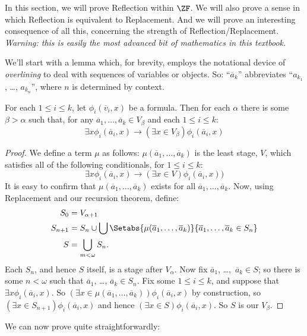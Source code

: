 \documentclass[../../../include/open-logic-section]{subfiles}
\begin{document}
In this section, we will prove Reflection within $\ZF$. We will also prove a sense in which Reflection is equivalent to Replacement. And we will prove an interesting consequence of all this, concerning the strength of Reflection/Replacement. \emph{Warning: this is easily the most advanced bit of mathematics in
this textbook.} 

We'll start with a
lemma which, for brevity, employs the notational device of
\emph{overlining} to deal with sequences of variables or objects. So:
``$\overline{a}_k$'' abbreviates ``$a_{k_1}$, \dots, $a_{k_n}$'', where
$n$ is determined by context.

\begin{lem}
For each $1 \leq i \leq k$, let $\phi_i(\overline{v}_i, x)$ be a
formula. Then for each $\alpha$
there is some $\beta > \alpha$ such that, for any $\overline{a}_1,
\ldots, \overline{a}_k \in V_\beta$ and each $1 \leq i \leq k$:
\[
	\exists x\phi_i(\overline{a}_i, x) \rightarrow (\exists x \in V_\beta) \phi_i(\overline{a}_i, x)
\]
\end{lem}

\begin{proof}
We define a term $\mu$ as follows: $\mu(\overline{a}_1, \ldots,
\overline{a}_k)$ is the least stage, $V$, which satisfies all of the
following conditionals, for $1 \leq i \leq k$:
\[
\exists x\phi_i(\overline{a}_i, x) \rightarrow (\exists x \in V) \phi_i(\overline{a}_i, x))
\]
It is easy to confirm that $\mu(\overline{a}_1, \ldots, \overline{a}_k)$ exists for all $\overline{a}_1, \ldots, \overline{a}_k$. Now, using Replacement and our recursion theorem, define:
\begin{align*}
	S_0 & = V_{\alpha+1}\\
	S_{n+1} & = S_n \cup \bigcup
	\Setabs{\mu(\overline{a}_1, \ldots, \overline{a}_k)}
	{\overline{a}_1, \ldots, \overline{a}_k \in S_n} \\
	S &= \bigcup_{m < \omega} S_n.
\end{align*}
Each $S_n$, and hence $S$ itself, is a stage after $V_\alpha$. Now fix
$\overline{a}_1$, \dots,~$\overline{a}_k \in S$; so there is some $n <
\omega$ such that $\overline{a}_1$, \dots, $\overline{a}_k \in S_n$.
Fix some $1 \leq i \leq k$, and suppose that $\exists x
\phi_i(\overline{a}_i,x)$. So $(\exists x \in \mu(\overline{a}_1,
\ldots, \overline{a}_k))\phi_i(\overline{a}_i, x)$ by construction, so
$(\exists x \in S_{n+1})\phi_i(\overline{a}_i, x)$ and hence
$(\exists x \in S)\phi_i(\overline{a}_i, x)$. So $S$ is our $V_\beta$.
\end{proof}
\noindent 
We can now prove  quite
straightforwardly:
\end{document}
